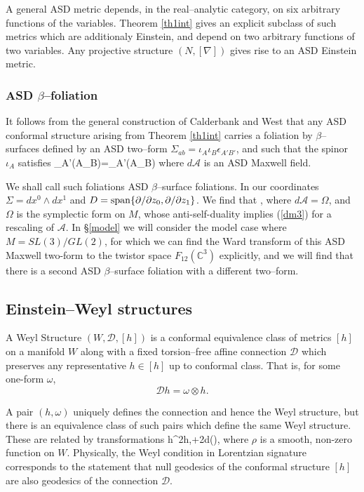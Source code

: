 A general ASD metric depends, in the real--analytic category, on six arbitrary functions of the variables. Theorem \ref{th1int} gives an explicit subclass of such metrics which are additionaly Einstein, and depend on two arbitrary functions of two variables. Any projective structure $(N, [\nabla])$ gives rise to an ASD Einstein metric.

\subsubsection{ASD $\beta$--foliation}
It follows from the general construction of Calderbank \cite{Cal1}
and West \cite{West}
that any ASD conformal structure arising from Theorem \ref{th1int} 
carries a foliation by $\beta$--surfaces defined by an ASD two--form
$\Sigma_{ab}=\iota_A\iota_B\epsilon_{A'B'}$, and  such that
the spinor $\iota_A$ satisfies
\be
\label{dm3}
\nabla_{A'(A}\iota_{B)}=_{A'(A}\iota_{B)}
\ee
where $d\mathcal{A}$ is an ASD Maxwell field.

We shall call such foliations ASD $\beta$--surface foliations. In our coordinates $\Sigma=dx^0\wedge dx^1$ and ${D}=\mathrm{span}\{\partial/\partial z_0,\partial/\partial z_1\}$. We find that
\be
\label{beta_eq}
\nabla{}\otimes \Sigma,
\ee
where $d\mathcal{A}=\Omega$, and $\Omega$ is the symplectic form on $M$, whose anti-self-duality implies (\ref{dm3}) for a rescaling of $\mathcal{A}$. In \S\ref{model} we will consider the model case where $M=SL(3)/GL(2)$, for which we can find the Ward transform of this ASD Maxwell two-form to the twistor space $F_{12}(\mathbb{C}^3)$
explicitly, and we will find that there is a second ASD $\beta$--surface foliation with a different two--form.


\subsection{Einstein--Weyl structures}
\begin{defi}
A Weyl Structure $(W,\mathcal{D},[h])$ is a conformal equivalence class of metrics $[h]$ on a manifold $W$ along with a fixed torsion--free affine connection $\mathcal{D}$ which preserves any representative $h\in[h]$ up to conformal class. That is, for some one-form $\omega$,
\[
\mathcal{D}h=\omega\otimes h.
\]
\end{defi}
A pair $(h,\omega)$ uniquely defines the connection and hence the Weyl structure, but there is an equivalence class of such pairs which define the same Weyl structure. These are related by transformations
\be
\label{weyl_tr}
h\rightarrow \rho^2h,\quad\omega\rightarrow\omega+2d(\rho),
\ee
where $\rho$ is a smooth, non-zero function on $W$. 
Physically, the Weyl condition in Lorentzian signature corresponds to the statement that null geodesics of the conformal structure $[h]$ are also geodesics of the connection $\mathcal{D}$.


